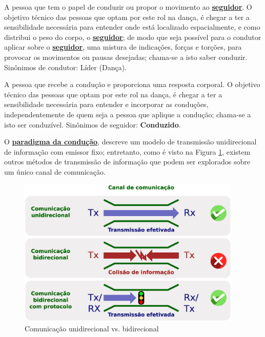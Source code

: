 \begin{definition} 
\label{def:Condutor} 
A pessoa que tem o papel de conduzir ou propor o movimento ao \hyperref[def:Seguidor]{\textbf{seguidor}}. 
O objetivo técnico das pessoas que optam por este rol na dança, é chegar 
a ter a sensibilidade necessária para entender onde está localizado espacialmente, 
e como distribui o peso do corpo, o \hyperref[def:Seguidor]{\textbf{seguidor}}; 
de modo que seja possível para o condutor aplicar sobre o \hyperref[def:Seguidor]{\textbf{seguidor}}, 
uma mistura de indicações, forças e torções,  
para provocar os movimentos ou pausas desejadas;
chama-se a isto saber conduzir.
Sinônimos de condutor: Líder (Dança).
\end{definition}

\begin{definition} 
\label{def:Seguidor} 
A pessoa que recebe a condução e proporciona uma resposta corporal. 
O objetivo técnico das pessoas que optam por este rol na dança, é chegar 
a ter a sensibilidade necessária para entender e incorporar as conduções,
independentemente de quem seja a pessoa que aplique a condução;
chama-se a isto ser conduzível.
Sinônimos de seguidor: \textbf{Conduzido}.
\end{definition}

O \hyperref[def:ParadigmaConducao]{\textbf{paradigma da condução}},
 descreve um modelo de transmissão unidirecional de informação com emissor fixo;
entretanto, como é visto na Figura \ref{fig:tiposcomunica}, 
existem outros métodos de transmissão de informação que podem ser explorados 
sobre um único canal de comunicação.
\begin{figure}[!ht]
     \centering
\includegraphics[width=0.95\textwidth]{chapters/cap-normas/tiposcomunica.eps}
\caption{Comunicação unidirecional vs. bidirecional}
\label{fig:tiposcomunica}
\end{figure}
